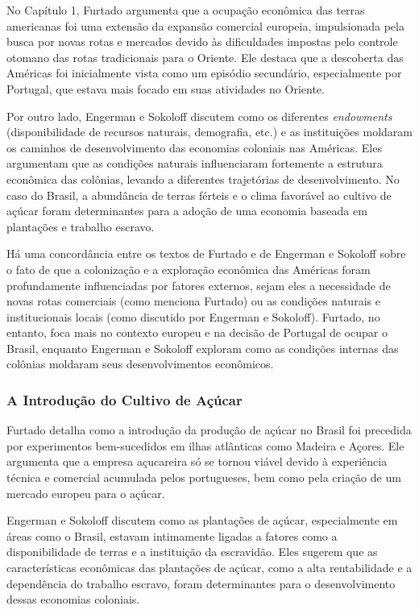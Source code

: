 \documentclass[a4paper,12pt]{article}[abntex2]
\begin{document}
No Capítulo 1, Furtado argumenta que a ocupação econômica das terras americanas foi uma extensão da expansão comercial europeia, impulsionada pela busca por novas rotas e mercados devido às dificuldades impostas pelo controle otomano das rotas tradicionais para o Oriente. Ele destaca que a descoberta das Américas foi inicialmente vista como um episódio secundário, especialmente por Portugal, que estava mais focado em suas atividades no Oriente.

Por outro lado, Engerman e Sokoloff discutem como os diferentes \textit{endowments} (disponibilidade de recursos naturais, demografia, etc.) e as instituições moldaram os caminhos de desenvolvimento das economias coloniais nas Américas. Eles argumentam que as condições naturais influenciaram fortemente a estrutura econômica das colônias, levando a diferentes trajetórias de desenvolvimento. No caso do Brasil, a abundância de terras férteis e o clima favorável ao cultivo de açúcar foram determinantes para a adoção de uma economia baseada em plantações e trabalho escravo.

Há uma concordância entre os textos de Furtado e de Engerman e Sokoloff sobre o fato de que a colonização e a exploração econômica das Américas foram profundamente influenciadas por fatores externos, sejam eles a necessidade de novas rotas comerciais (como menciona Furtado) ou as condições naturais e institucionais locais (como discutido por Engerman e Sokoloff). Furtado, no entanto, foca mais no contexto europeu e na decisão de Portugal de ocupar o Brasil, enquanto Engerman e Sokoloff exploram como as condições internas das colônias moldaram seus desenvolvimentos econômicos.

\subsubsection*{A Introdução do Cultivo de Açúcar}

Furtado detalha como a introdução da produção de açúcar no Brasil foi precedida por experimentos bem-sucedidos em ilhas atlânticas como Madeira e Açores. Ele argumenta que a empresa açucareira só se tornou viável devido à experiência técnica e comercial acumulada pelos portugueses, bem como pela criação de um mercado europeu para o açúcar.

Engerman e Sokoloff discutem como as plantações de açúcar, especialmente em áreas como o Brasil, estavam intimamente ligadas a fatores como a disponibilidade de terras e a instituição da escravidão. Eles sugerem que as características econômicas das plantações de açúcar, como a alta rentabilidade e a dependência do trabalho escravo, foram determinantes para o desenvolvimento dessas economias coloniais.
\end{document}
